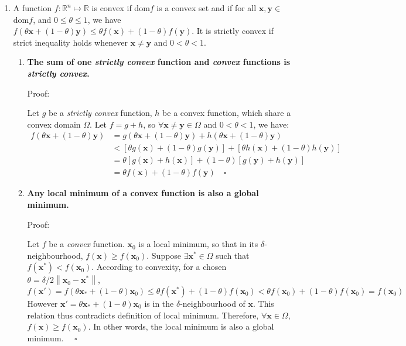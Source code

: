 \documentclass[a4paper, 10pt]{article}
\begin{document}
\begin{enumerate}[label=(\alph*)]
\item A function $f: \mathbb{R}^n \mapsto \mathbb{R}$ is convex if dom$f$ is a convex set and if for all $\mathbf{x}, \mathbf{y} \in$ dom$f$, and $0\leq \theta \leq 1$, we have $f(\theta \mathbf{x} + (1 - \theta) \mathbf{y}) \leq \theta f(\mathbf{x}) + (1 - \theta) f(\mathbf{y})$. It is strictly convex if strict inequality holds whenever $\mathbf{x}\neq \mathbf{y}$ and $0 < \theta < 1$.
\begin{enumerate}[label=(\arabic*)]
    \item \textbf{The sum of one \textit{strictly convex} function and \textit{convex} functions is \textit{strictly convex}.}
    
    Proof:
    
    Let $g$ be a \textit{strictly convex} function, $h$ be a convex function, which share a convex domain $\Omega$. Let $f = g + h$, so $\forall \mathbf{x}\neq \mathbf{y} \in \Omega$ and $0 < \theta < 1$, we have:
    \begin{equation}
        \begin{aligned}
            f(\theta \mathbf{x} + (1-\theta) \mathbf{y}) &= g(\theta \mathbf{x} + (1-\theta) \mathbf{y}) + h(\theta \mathbf{x} + (1-\theta) \mathbf{y}) \\ 
            &< \left[\theta g(\mathbf{x}) + (1-\theta) g(\mathbf{y})\right] + \left[\theta h(\mathbf{x}) + (1-\theta) h(\mathbf{y})\right] \\ 
            &=\theta \left[g(\mathbf{x}) + h(\mathbf{x})\right] + (1 - \theta) \left[g(\mathbf{y}) + h(\mathbf{y})\right]\\ 
            &= \theta f(\mathbf{x}) + (1-\theta) f(\mathbf{y}) \quad \square
        \end{aligned}
    \end{equation}
    
    \item \textbf{Any local minimum of a convex function is also a global minimum.}
    
    Proof:
    
    Let $f$ be a \textit{convex} function. $\mathbf{x}_0$ is a local minimum, so that in its $\delta$-neighbourhood, $f(\mathbf{x}) \geq f(\mathbf{x}_0)$. Suppose $\exists \mathbf{x}^* \in \Omega$ such that $f(\mathbf{x}^*) < f(\mathbf{x}_0)$. According to convexity, for a chosen $\theta = \delta/2\left\|\mathbf{x}_0 - \mathbf{x}^*\right\|$,
    \begin{equation}
        f(\mathbf{x}') = f(\theta \mathbf{x}_* + (1 - \theta) \mathbf{x}_0 ) \leq \theta f(\mathbf{x}^*) + (1 - \theta) f(\mathbf{x}_0) < \theta f(\mathbf{x}_0) + (1 - \theta) f(\mathbf{x}_0) = f(\mathbf{x}_0)
    \end{equation}
    However $\mathbf{x}' = \theta \mathbf{x}_* + (1 - \theta) \mathbf{x}_0$ is in the $\delta$-neighbourhood of $\mathbf{x}$. This relation thus contradicts definition of local minimum. Therefore, $\forall \mathbf{x} \in \Omega$, $f(\mathbf{x}) \geq f(\mathbf{x}_0)$. In other words, the local minimum is also a global minimum. $\quad \square$
    

\end{enumerate}
\end{enumerate}
\end{document}
